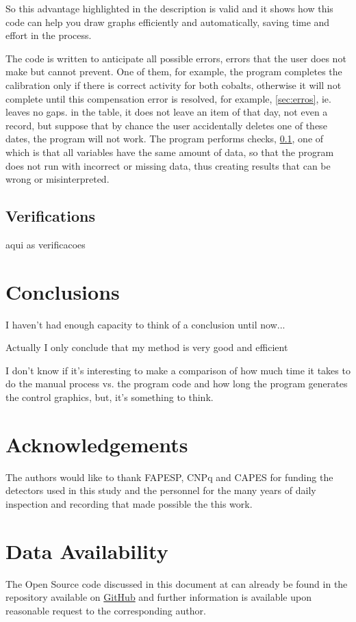 \documentclass[fleqn,usenatbib]{rasti}
\begin{document}
So this advantage highlighted in the description is valid and it shows how this code can help you draw graphs efficiently and automatically, saving time and effort in the process.

The code is written to anticipate all possible errors, errors that the user does not make but cannot prevent. One of them, for example, the program completes the calibration only if there is correct activity for both cobalts, otherwise it will not complete until this compensation error is resolved, for example, \ref{sec:erros}, ie. leaves no gaps. in the table, it does not leave an item of that day, not even a record, but suppose that by chance the user accidentally deletes one of these dates, the program will not work. The program performs checks, \ref{sec:Verifications}, one of which is that all variables have the same amount of data, so that the program does not run with incorrect or missing data, thus creating results that can be wrong or misinterpreted.

\subsection{Verifications}
\label{sec:Verifications} 
aqui as verificacoes 

\section{Conclusions}

I haven't had enough capacity to think of a conclusion until now...

Actually I only conclude that my method is very good and efficient

I don't know if it's interesting to make a comparison of how much time it takes to do the manual process vs. the program code and how long the program generates the control graphics, but, it's something to think.


\section*{Acknowledgements}

The authors would like to thank FAPESP, CNPq and CAPES for funding the detectors used in this study and the personnel for the many years of daily inspection and recording that made possible the this work.

\section*{Data Availability}
The Open Source code discussed in this document at can already be found in the repository available on  \href{https://github.com/Gustavo-Pires/CCR-Calculo-de-concetracao-de-rafionuclideos}{GitHub} and further information is available upon reasonable request to the corresponding author.
\end{document}

